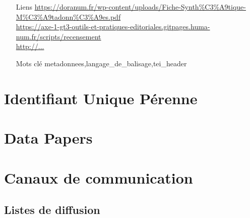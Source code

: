 \documentclass{book}
\begin{document}
\begin{itemize}
    \item [Liens]
        \url{https://doranum.fr/wp-content/uploads/Fiche-Synth%C3%A9tique-M%C3%A9tadonn%C3%A9es.pdf}\\
        \url{https://axe-1-gt3-outils-et-pratiques-editoriales.gitpages.huma-num.fr/scripts/recensement}\\
        \url{http://...}\\
    \item [Mots clé]
        \gls{metadonnees},\gls{langage_de_balisage},\gls{tei_header}
\end{itemize}

	
\section{Identifiant Unique Pérenne}
 

\clearpage


\section{Data Papers}

\section{Canaux de communication}

\subsection{Listes de diffusion}
\end{document}
